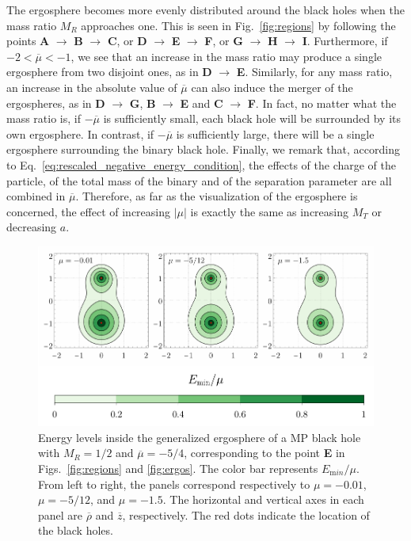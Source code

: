 The ergosphere becomes more evenly distributed around the black holes when the mass ratio $M_R$ approaches one. This is seen in Fig.~\ref{fig:regions} by following the points \textbf{A} $\rightarrow$ \textbf{B} $\rightarrow$ \textbf{C}, or \textbf{D} $\rightarrow$ \textbf{E} $\rightarrow$ \textbf{F}, or \textbf{G} $\rightarrow$ \textbf{H} $\rightarrow$ \textbf{I}. Furthermore, if $-2 < \overline \mu < -1$, we see that an increase in the mass ratio may produce a single ergosphere from two disjoint ones, as in \textbf{D} $\rightarrow$ \textbf{E}. Similarly, for any mass ratio, an increase in the absolute value of $\overline \mu$ can also induce the merger of the ergospheres, as in \textbf{D} $\rightarrow$ \textbf{G}, \textbf{B} $\rightarrow$ \textbf{E} and \textbf{C} $\rightarrow$ \textbf{F}. In fact, no matter what the mass ratio is, if $-\overline \mu$ is sufficiently small, each black hole will be surrounded by its own ergosphere. In contrast, if $-\overline \mu$ is sufficiently large, there will be a single ergosphere surrounding the binary black hole. Finally, we remark that, according to Eq.~\eqref{eq:rescaled_negative_energy_condition}, the effects of the charge of the particle, of the total mass of the binary and of the separation parameter are all combined in $\overline \mu$. Therefore, as far as the visualization of the ergosphere is concerned, the effect of increasing $|\mu|$ is exactly the same as increasing $M_T$ or decreasing $a$.

\begin{figure}[!ht]
  \centering
  \includegraphics[width=\linewidth]{img/penrose_binaries/fig3.pdf}
  \caption{Energy levels inside the generalized ergosphere of a MP black hole with $M_R=1/2$ and $\overline \mu = -5/4$, corresponding to the point \textbf{E} in Figs.~\ref{fig:regions} and \ref{fig:ergos}. The color bar represents $E_{\mathrm min}/\mu$. From left to right, the panels correspond respectively to $\mu=-0.01$, $\mu=-5/12$, and $\mu=-1.5$. The horizontal and vertical axes in each panel are $\overline \rho$ and $\overline z$, respectively. The red dots indicate the location of the black holes.}
  \label{fig:energylevels}
\end{figure}


